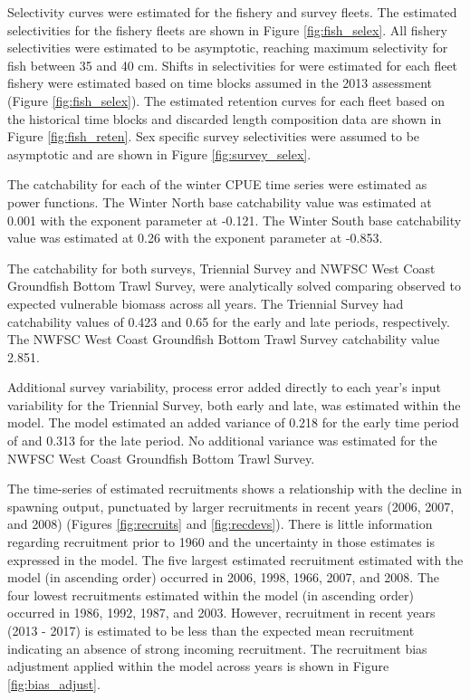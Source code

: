 \documentclass[12pt,]{article}
\begin{document}
Selectivity curves were estimated for the fishery and survey fleets. The
estimated selectivities for the fishery fleets are shown in Figure
\ref{fig:fish_selex}. All fishery selectivities were estimated to be
asymptotic, reaching maximum selectivity for fish between 35 and 40 cm.
Shifts in selectivities for were estimated for each fleet fishery were
estimated based on time blocks assumed in the 2013 assessment (Figure
\ref{fig:fish_selex}). The estimated retention curves for each fleet
based on the historical time blocks and discarded length composition
data are shown in Figure \ref{fig:fish_reten}. Sex specific survey
selectivities were assumed to be asymptotic and are shown in Figure
\ref{fig:survey_selex}.

The catchability for each of the winter CPUE time series were estimated
as power functions. The Winter North base catchability value was
estimated at 0.001 with the exponent parameter at -0.121. The Winter
South base catchability value was estimated at 0.26 with the exponent
parameter at -0.853.

The catchability for both surveys, Triennial Survey and NWFSC West Coast
Groundfish Bottom Trawl Survey, were analytically solved comparing
observed to expected vulnerable biomass across all years. The Triennial
Survey had catchability values of 0.423 and 0.65 for the early and late
periods, respectively. The NWFSC West Coast Groundfish Bottom Trawl
Survey catchability value 2.851.

Additional survey variability, process error added directly to each
year's input variability for the Triennial Survey, both early and late,
was estimated within the model. The model estimated an added variance of
0.218 for the early time period of and 0.313 for the late period. No
additional variance was estimated for the NWFSC West Coast Groundfish
Bottom Trawl Survey.

The time-series of estimated recruitments shows a relationship with the
decline in spawning output, punctuated by larger recruitments in recent
years (2006, 2007, and 2008) (Figures \ref{fig:recruits} and
\ref{fig:recdevs}). There is little information regarding recruitment
prior to 1960 and the uncertainty in those estimates is expressed in the
model. The five largest estimated recruitment estimated with the model
(in ascending order) occurred in 2006, 1998, 1966, 2007, and 2008. The
four lowest recruitments estimated within the model (in ascending order)
occurred in 1986, 1992, 1987, and 2003. However, recruitment in recent
years (2013 - 2017) is estimated to be less than the expected mean
recruitment indicating an absence of strong incoming recruitment. The
recruitment bias adjustment applied within the model across years is
shown in Figure \ref{fig:bias_adjust}.
\end{document}
